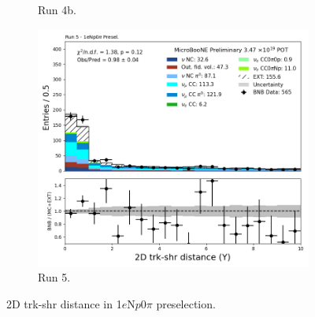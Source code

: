 \begin{figure}[H]
\begin{subfigure}[t]{0.32\linewidth}
        \caption{Run 4b.}
    \end{subfigure}%
    \hspace{0.2cm}%
    \begin{subfigure}[t]{0.32\linewidth}
        \includegraphics[width=\linewidth]{technote/Appendix_Preselection/Figures/1eNp0pi/Run5/trkshrhitdist2_Run5_1eNp0pi_Presel.png}
        \caption{Run 5.}
    \end{subfigure}
    \caption{2D trk-shr distance in 1$e$N$p$0$\pi$ preselection.}
\end{figure}

